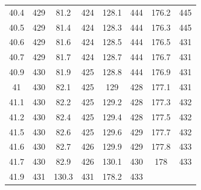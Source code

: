 \documentclass[12pt]{ctexart}
\numberwithin{equation}{section}
\begin{document}
\begin{longtable}{cc|cc|cc|cc}
40.4  &  429  &  81.2  &  424  &  128.1  &  444  &  176.2  &  445  \\
40.5  &  429  &  81.4  &  424  &  128.3  &  444  &  176.3  &  445  \\
40.6  &  429  &  81.6  &  424  &  128.5  &  444  &  176.5  &  431  \\
40.7  &  429  &  81.7  &  424  &  128.7  &  444  &  176.7  &  431  \\
40.9  &  430  &  81.9  &  425  &  128.8  &  444  &  176.9  &  431  \\
41  &  430  &  82.1  &  425  &  129  &  428  &  177.1  &  431  \\
41.1  &  430  &  82.2  &  425  &  129.2  &  428  &  177.3  &  432  \\
41.2  &  430  &  82.4  &  425  &  129.4  &  428  &  177.5  &  432  \\
41.5  &  430  &  82.6  &  425  &  129.6  &  429  &  177.7  &  432  \\
41.6  &  430  &  82.7  &  426  &  129.9  &  429  &  177.8  &  433  \\
41.7  &  430  &  82.9  &  426  &  130.1  &  430  &  178  &  433  \\
41.9  &  431  &  130.3  &  431  &  178.2  &  433  \\

    
\end{longtable}
\end{document}

